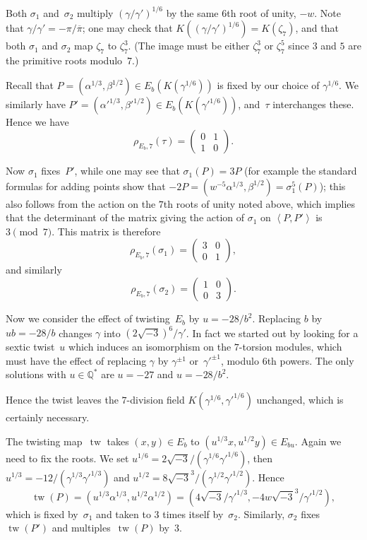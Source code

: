 \documentclass[12pt]{amsart}
\newcommand{\Q}{\mathbb{Q}}
\DeclareMathOperator{\tw}{tw}
\def\r3{\sqrt{-3}}
\def\pibar{\overline{\pi}}
\numberwithin{equation}{section}
\theoremstyle{definition}
\theoremstyle{remark}
\begin{document}
Both $\sigma_1$ and~$\sigma_2$ multiply $(\gamma/\gamma')^{1/6}$ by
the same $6$th root of unity, $-w$.  Note that
$\gamma/\gamma'=-\pi/\pibar$; one may check that
$K((\gamma/\gamma')^{1/6})=K(\zeta_7)$, and that both $\sigma_1$ and
$\sigma_2$ map $\zeta_7$ to $\zeta_7^3$.  (The image must be either
$\zeta_7^3$ or $\zeta_7^5$ since $3$ and $5$ are the primitive roots
modulo~$7$.)

Recall that $P=(\alpha^{1/3},\beta^{1/2})\in E_b(K(\gamma^{1/6}))$ is
fixed by our choice of $\gamma^{1/6}$.  We similarly have
$P'=(\alpha'^{1/3},\beta'^{1/2})\in E_b(K(\gamma'^{1/6}))$, and~$\tau$
interchanges these.  Hence we have
\[
   \rho_{E_b,7}(\tau) = \begin{pmatrix}0&1\\1&0   \end{pmatrix}.
\]


Now $\sigma_1$ fixes~$P'$, while one may see that $\sigma_1(P)=3P$
(for example the standard formulas for adding points show that
$-2P=(w^{-5}\alpha^{1/3},\beta^{1/2})=\sigma_1^5(P)$); this also
follows from the action on the $7$th roots of unity noted above, which
implies that the determinant of the matrix giving the action of
$\sigma_1$ on $\left<P,P'\right>$ is $3\pmod7$.  This matrix is
therefore
\[
   \rho_{E_b,7}(\sigma_1) = \begin{pmatrix}3&0\\0&1   \end{pmatrix},
\]
and similarly
\[
   \rho_{E_b,7}(\sigma_2) = \begin{pmatrix}1&0\\0&3   \end{pmatrix}.
\]

Now we consider the effect of twisting~$E_b$ by $u=-28/b^2$.
Replacing $b$ by $ub=-28/b$ changes $\gamma$ into $(2\r3)^6/\gamma'$.
In fact we started out by looking for a sextic twist~$u$ which induces
an isomorphism on the $7$-torsion modules, which must have the effect
of replacing $\gamma$ by $\gamma^{\pm1}$ or~$\gamma'^{\pm1}$, modulo
$6$th powers.  The only solutions with $u\in\Q^*$ are $u=-27$ and
$u=-28/b^2$.

Hence the twist leaves the $7$-division field
$K(\gamma^{1/6},\gamma'^{1/6})$ unchanged, which is certainly
necessary.

The twisting map~$\tw$ takes $(x,y)\in E_b$ to $(u^{1/3}x,u^{1/2}y)\in
E_{bu}$.  Again we need to fix the roots.  We set
$u^{1/6}=2\r3/(\gamma^{1/6}\gamma'^{1/6})$, then
$u^{1/3}=-12/(\gamma^{1/3}\gamma'^{1/3})$ and
$u^{1/2}=8\r3^3/(\gamma^{1/2}\gamma'^{1/2})$.  Hence
\[
 \tw(P) = (u^{1/3}\alpha^{1/3},u^{1/2}\alpha^{1/2}) =
(4\r3/\gamma'^{1/3},-4w\r3^3/\gamma'^{1/2}),
\]
which is fixed by~$\sigma_1$ and taken to $3$ times itself
by~$\sigma_2$.  Similarly, $\sigma_2$ fixes $\tw(P')$ and
multiples~$\tw(P)$ by~$3$.
\end{document}
